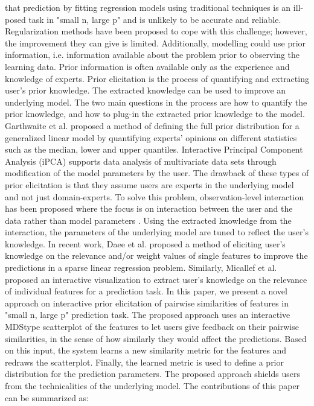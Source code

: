 \documentclass{sig-alternate}
\begin{document}
\normalsize that prediction by fitting regression models using traditional techniques
is an ill-posed task in "small n, large p" and is unlikely to be
accurate and reliable. Regularization methods \cite{Tibshirani94regressionshrinkage,Zou98894} have been
proposed to cope with this challenge; however, the improvement
they can give is limited. Additionally, modelling could use prior
information, i.e. information available about the problem prior to
observing the learning data. Prior information is often available
only as the experience and knowledge of experts. Prior elicitation
is the process of quantifying and extracting user's prior knowledge.
The extracted knowledge can be used to improve an underlying
model. The two main questions in the process are how to quantify
the prior knowledge, and how to plug-in the extracted prior
knowledge to the model.
Garthwaite et al. \cite{Garthwaite12} proposed a method of defining the full
prior distribution for a generalized linear model by quantifying
experts' opinions on different statistics such as the median, lower
and upper quantiles. Interactive Principal Component Analysis
(iPCA) \cite{Jeong:2009:IIS:2421899.2421907} supports data analysis of multivariate data sets through
modification of the model parameters by the user. The drawback
of these types of prior elicitation is that they assume users are
experts in the underlying model and not just domain-experts. To
solve this problem, observation-level interaction has been proposed
where the focus is on interaction between the user and the data
rather than model parameters \cite{Liu:2012:DLD:2478276.2478281,DBLP:conf/ieeevast/EndertHMHLN11}. Using the extracted knowledge
from the interaction, the parameters of the underlying model are
tuned to reflect the user's knowledge. In recent work, Daee et al. \cite{Daee65754}
proposed a method of eliciting user's knowledge on the relevance
and/or weight values of single features to improve the predictions
in a sparse linear regression problem. Similarly, Micallef et al. \cite{Micallef:2017:IEK:3025171.3025181}
proposed an interactive visualization to extract user's knowledge
on the relevance of individual features for a prediction task.
In this paper, we present a novel approach on interactive prior
elicitation of pairwise similarities of features in "small n, large p"
prediction task. The proposed approach uses an interactive MDStype
scatterplot of the features to let users give feedback on their
pairwise similarities, in the sense of how similarly they would
affect the predictions. Based on this input, the system learns a
new similarity metric for the features and redraws the scatterplot.
Finally, the learned metric is used to define a prior distribution for
the prediction parameters. The proposed approach shields users
from the technicalities of the underlying model. The contributions
of this paper can be summarized as:
\end{document}
